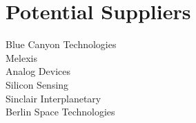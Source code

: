\section{Potential Suppliers}
Blue Canyon Technologies\\
Melexis\\
Analog Devices\\
Silicon Sensing\\
Sinclair Interplanetary\\
Berlin Space Technologies\\





